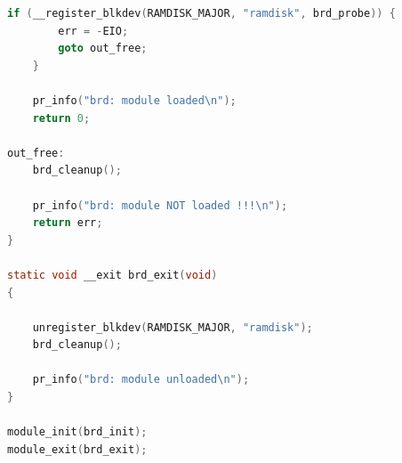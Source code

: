 \begin{lstlisting}[language=C, caption={brd.c}]
	if (__register_blkdev(RAMDISK_MAJOR, "ramdisk", brd_probe)) {
		err = -EIO;
		goto out_free;
	}

	pr_info("brd: module loaded\n");
	return 0;

out_free:
	brd_cleanup();

	pr_info("brd: module NOT loaded !!!\n");
	return err;
}

static void __exit brd_exit(void)
{

	unregister_blkdev(RAMDISK_MAJOR, "ramdisk");
	brd_cleanup();

	pr_info("brd: module unloaded\n");
}

module_init(brd_init);
module_exit(brd_exit);
\end{lstlisting}

